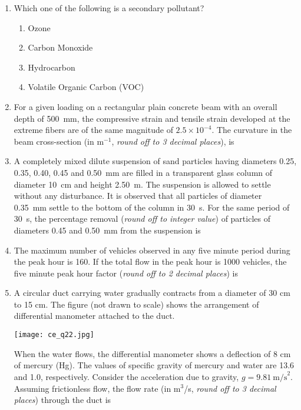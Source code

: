 \documentclass[12pt]{article}
\begin{document}
\begin{enumerate}[label=Q.\arabic*]
	\item Which one of the following is a secondary pollutant?
		\begin{enumerate}[label=(\Alph*)]
			\item Ozone  
			\item Carbon Monoxide  
			\item Hydrocarbon  
			\item Volatile Organic Carbon (VOC)  
		\end{enumerate}

	\item For a given loading on a rectangular plain concrete beam with an overall depth of 500~mm, the compressive strain and tensile strain developed at the extreme fibers are of the same magnitude of $2.5 \times 10^{-4}$. The curvature in the beam cross-section (in m$^{-1}$, \textit{round off to 3 decimal places}), is \underline{\hspace{2cm}}

	\item A completely mixed dilute suspension of sand particles having diameters 0.25, 0.35, 0.40, 0.45 and 0.50~mm are filled in a transparent glass column of diameter 10~cm and height 2.50~m. The suspension is allowed to settle without any disturbance. It is observed that all particles of diameter 0.35~mm settle to the bottom of the column in 30~s. For the same period of 30~s, the percentage removal (\textit{round off to integer value}) of particles of diameters 0.45 and 0.50~mm from the suspension is \underline{\hspace{2cm}} 

	\item The maximum number of vehicles observed in any five minute period during the peak hour is 160. If the total flow in the peak hour is 1000 vehicles, the five minute peak hour factor (\textit{round off to 2 decimal places}) is \underline{\hspace{2cm}}

	\item A circular duct carrying water gradually contracts from a diameter of 30 cm to 15 cm. The figure (not drawn to scale) shows the arrangement of differential manometer attached to the duct.

		\begin{center}
			\texttt{[image: ce\_q22.jpg]}
		\end{center}

		When the water flows, the differential manometer shows a deflection of 8 cm of mercury (Hg). The values of specific gravity of mercury and water are 13.6 and 1.0, respectively. Consider the acceleration due to gravity, $g = 9.81~\text{m/s}^2$. Assuming frictionless flow, the flow rate (in m$^3$/s, \textit{round off to 3 decimal places}) through the duct is \underline{\hspace{2cm}}



\end{enumerate}
\end{document}
